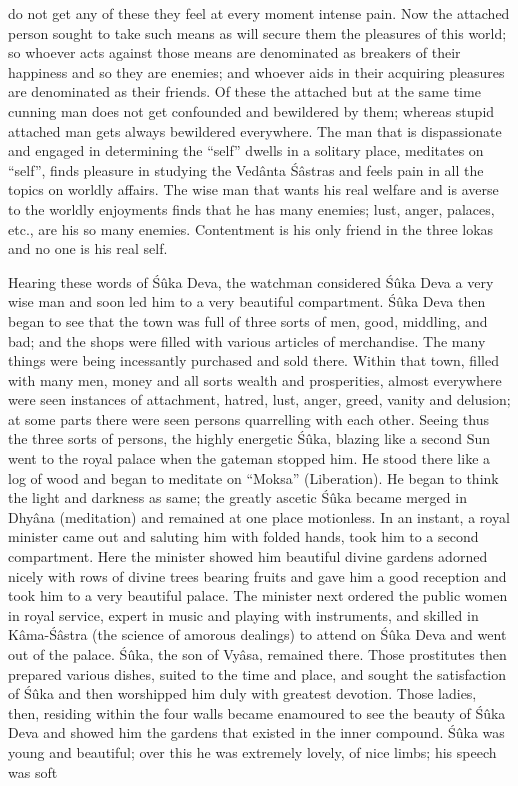 do not get any of these they feel at every moment intense pain. Now the attached person sought to take such means as will secure them the pleasures of this world; so whoever acts against those means are denominated as breakers of their happiness and so they are enemies; and whoever aids in their acquiring pleasures are denominated as their friends. Of these the attached but at the same time cunning man does not get confounded and bewildered by them; whereas stupid attached man gets always bewildered everywhere. The man that is dispassionate and engaged in determining the ``self'' dwells in a solitary place, meditates on ``self'', finds pleasure in studying the Ved\^anta  \'S\^astras and feels pain in all the topics on worldly affairs. The wise man that wants his real welfare and is averse to the worldly enjoyments finds that he has many enemies; lust, anger, palaces, etc., are his so many enemies. Contentment is his only friend in the three lokas and no one is his real self.

Hearing these words of \'S\^uka Deva, the watchman considered \'S\^uka Deva a very wise man and soon led him to a very beautiful compartment. \'S\^uka Deva then began to see that the town was full of three sorts of men, good, middling, and bad; and the shops were filled with various articles of merchandise. The many things were being incessantly purchased and sold there. Within that town, filled with many men, money and all sorts wealth and prosperities, almost everywhere were seen instances of attachment, hatred, lust, anger, greed, vanity and delusion; at some parts there were seen persons quarrelling with each other. Seeing thus the three sorts of persons, the highly energetic \'S\^uka, blazing like a second Sun went to the royal palace when the gateman stopped him. He stood there like a log of wood and began to meditate on ``Moksa'' (Liberation). He began to think the light and darkness as same; the greatly ascetic \'S\^uka became merged in Dhy\^ana (meditation) and remained at one place motionless. In an instant, a royal minister came out and saluting him with folded hands, took him to a second compartment. Here the minister showed him beautiful divine gardens adorned nicely with rows of divine trees bearing fruits and gave him a good reception and took him to a very beautiful palace. The minister next ordered the public women in royal service, expert in music and playing with instruments, and skilled in K\^ama-\'S\^astra (the science of amorous dealings) to attend on \'S\^uka Deva and went out of the palace. \'S\^uka, the son of Vy\^asa, remained there. Those prostitutes then prepared various dishes, suited to the time and place, and sought the satisfaction of \'S\^uka and then worshipped him duly with greatest devotion. Those ladies, then, residing within the four walls became enamoured to see the beauty of \'S\^uka Deva and showed him the gardens that existed in the inner compound. \'S\^uka was young and beautiful; over this he was extremely lovely, of nice limbs; his speech was soft

